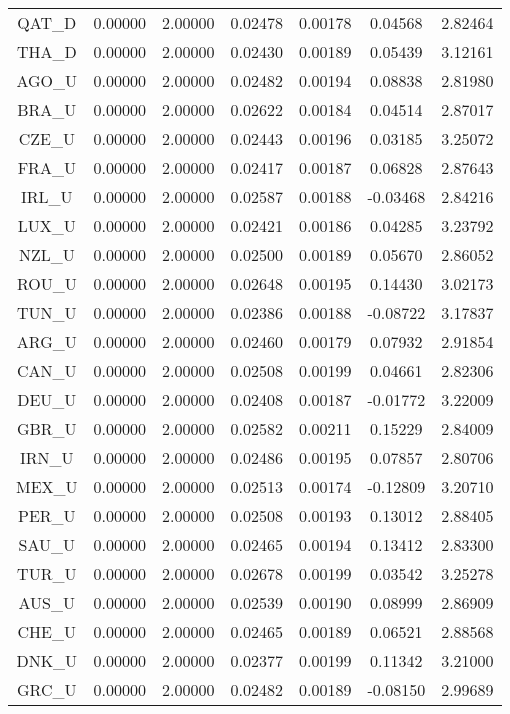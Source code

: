 \begin{longtable}{c c c c c c c}
QAT_D & 0.00000 & 2.00000 & 0.02478 & 0.00178 & 0.04568 & 2.82464 \\
THA_D & 0.00000 & 2.00000 & 0.02430 & 0.00189 & 0.05439 & 3.12161 \\
AGO_U & 0.00000 & 2.00000 & 0.02482 & 0.00194 & 0.08838 & 2.81980 \\
BRA_U & 0.00000 & 2.00000 & 0.02622 & 0.00184 & 0.04514 & 2.87017 \\
CZE_U & 0.00000 & 2.00000 & 0.02443 & 0.00196 & 0.03185 & 3.25072 \\
FRA_U & 0.00000 & 2.00000 & 0.02417 & 0.00187 & 0.06828 & 2.87643 \\
IRL_U & 0.00000 & 2.00000 & 0.02587 & 0.00188 & -0.03468 & 2.84216 \\
LUX_U & 0.00000 & 2.00000 & 0.02421 & 0.00186 & 0.04285 & 3.23792 \\
NZL_U & 0.00000 & 2.00000 & 0.02500 & 0.00189 & 0.05670 & 2.86052 \\
ROU_U & 0.00000 & 2.00000 & 0.02648 & 0.00195 & 0.14430 & 3.02173 \\
TUN_U & 0.00000 & 2.00000 & 0.02386 & 0.00188 & -0.08722 & 3.17837 \\
ARG_U & 0.00000 & 2.00000 & 0.02460 & 0.00179 & 0.07932 & 2.91854 \\
CAN_U & 0.00000 & 2.00000 & 0.02508 & 0.00199 & 0.04661 & 2.82306 \\
DEU_U & 0.00000 & 2.00000 & 0.02408 & 0.00187 & -0.01772 & 3.22009 \\
GBR_U & 0.00000 & 2.00000 & 0.02582 & 0.00211 & 0.15229 & 2.84009 \\
IRN_U & 0.00000 & 2.00000 & 0.02486 & 0.00195 & 0.07857 & 2.80706 \\
MEX_U & 0.00000 & 2.00000 & 0.02513 & 0.00174 & -0.12809 & 3.20710 \\
PER_U & 0.00000 & 2.00000 & 0.02508 & 0.00193 & 0.13012 & 2.88405 \\
SAU_U & 0.00000 & 2.00000 & 0.02465 & 0.00194 & 0.13412 & 2.83300 \\
TUR_U & 0.00000 & 2.00000 & 0.02678 & 0.00199 & 0.03542 & 3.25278 \\
AUS_U & 0.00000 & 2.00000 & 0.02539 & 0.00190 & 0.08999 & 2.86909 \\
CHE_U & 0.00000 & 2.00000 & 0.02465 & 0.00189 & 0.06521 & 2.88568 \\
DNK_U & 0.00000 & 2.00000 & 0.02377 & 0.00199 & 0.11342 & 3.21000 \\
GRC_U & 0.00000 & 2.00000 & 0.02482 & 0.00189 & -0.08150 & 2.99689 \\

\end{longtable}
